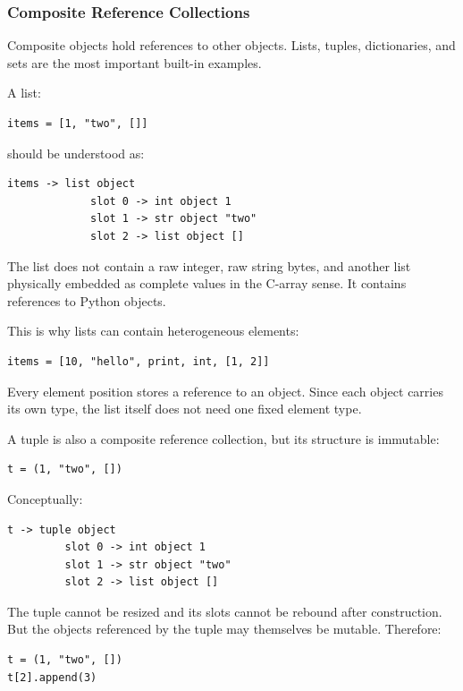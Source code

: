 \subsubsection*{Composite Reference Collections}

Composite objects hold references to other objects. Lists, tuples, dictionaries, and sets are the most important built-in examples.

A list:

\begin{verbatim}
items = [1, "two", []]
\end{verbatim}

should be understood as:

\begin{verbatim}
items -> list object
             slot 0 -> int object 1
             slot 1 -> str object "two"
             slot 2 -> list object []
\end{verbatim}

The list does not contain a raw integer, raw string bytes, and another list physically embedded as complete values in the C-array sense. It contains references to Python objects.

This is why lists can contain heterogeneous elements:

\begin{verbatim}
items = [10, "hello", print, int, [1, 2]]
\end{verbatim}

Every element position stores a reference to an object. Since each object carries its own type, the list itself does not need one fixed element type.

A tuple is also a composite reference collection, but its structure is immutable:

\begin{verbatim}
t = (1, "two", [])
\end{verbatim}

Conceptually:

\begin{verbatim}
t -> tuple object
         slot 0 -> int object 1
         slot 1 -> str object "two"
         slot 2 -> list object []
\end{verbatim}

The tuple cannot be resized and its slots cannot be rebound after construction. But the objects referenced by the tuple may themselves be mutable. Therefore:

\begin{verbatim}
t = (1, "two", [])
t[2].append(3)
\end{verbatim}

